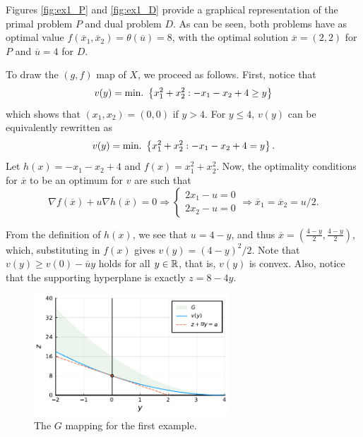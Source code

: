 Figures \ref{fig:ex1_P} and \ref{fig:ex1_D} provide a graphical representation of the primal problem $P$ and dual problem $D$. As can be seen, both problems have as optimal value $f(\overline{x}_1,\overline{x}_2) = \theta(\overline{u}) = 8$, with the optimal solution $\overline{x} = (2,2)$ for $P$ and $\overline{u} = 4$ for $D$.

To draw the $(g,f)$ map of $X$, we proceed as follows. First, notice that 
$$
v(y) = \mathop{\text{min.~}} \left\{ x_1^2 + x_2^2 : -x_1 -x_2 + 4 \geq y \right \}
$$
which shows that $(x_1, x_2) = (0,0)$ if $y > 4$. For $y \le 4$, $v(y)$ can be equivalently rewritten as
$$
v(y) = \mathop{\text{min.~}} \left\{ x_1^2 + x_2^2 : -x_1 -x_2 + 4 = y \right \}.
$$
Let $h(x) = -x_1 - x_2 + 4$ and $f(x) = x_1^2 + x_2^2$. Now, the optimality conditions for $\overline{x}$ to be an optimum for $v$ are such that
$$
\nabla f(\overline{x}) + u \nabla h(\overline{x}) = 0 \Rightarrow \begin{cases} 2x_1 - u = 0 \\ 2x_2 - u =0\end{cases} \Rightarrow	\overline{x}_1  = \overline{x}_2 = u/2.
$$

From the definition of $h(x)$, we see that $u = 4-y$, and thus $\overline{x} = (\frac{4-y}{2}, \frac{4-y}{2})$, which, substituting in $f(x)$ gives $v(y) = (4-y)^2/2$. Note that $v(y) \geq v(0) - \overline{u}y$ holds for all $y \in \mathbb{R}$, that is, $v(y)$ is convex. Also, notice that the supporting hyperplane is exactly $z = 8 -4y$. 

\begin{figure}
	\includegraphics[width = 0.65\textwidth]{part_2/chapter_8/figures/ex1_3.pdf}
	\caption{The $G$ mapping for the first example.}	
\end{figure}

